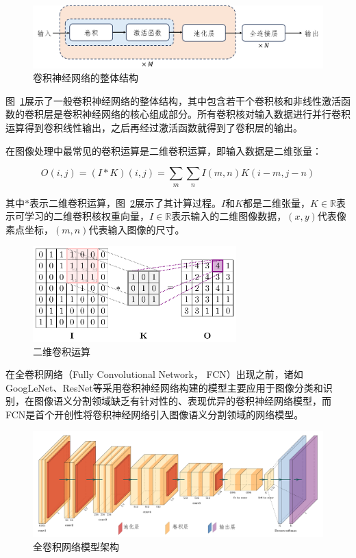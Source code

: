 \begin{figure}[htbp]
    \centering
    \includegraphics[width=\textwidth]{fig/cnn_frame.png}
    \caption{卷积神经网络的整体结构}
    \label{fig:cnn}
\end{figure}

图~\ref{fig:cnn}展示了一般卷积神经网络的整体结构，其中包含若干个卷积核和非线性激活函数的卷积层是卷积神经网络的核心组成部分。所有卷积核对输入数据进行并行卷积运算得到卷积线性输出，之后再经过激活函数就得到了卷积层的输出\cite{Goodfellow-et-al-2016}。

在图像处理中最常见的卷积运算是二维卷积运算，即输入数据是二维张量：

\begin{equation}
    O(i, j)=(I * K)(i, j)=\sum_{m} \sum_{n} I(m, n) K(i-m, j-n)
\end{equation}

其中$*$表示二维卷积运算，图~\ref{fig:2dcnn}展示了其计算过程。$I$和$K$都是二维张量，$ K \in \mathbb{R}$表示可学习的二维卷积核权重向量，$I \in \mathbb{R}$表示输入的二维图像数据，$(x, y)$代表像素点坐标，$(m, n)$代表输入图像的尺寸。

\begin{figure}[!htbp]
    \centering
    \includegraphics[width=0.7\textwidth]{fig/2dcnn-1.png}
    \caption{二维卷积运算}
    \label{fig:2dcnn}
\end{figure}

在全卷积网络（Fully Convolutional Network， FCN）出现之前，诸如GoogLeNet、ResNet等\cite{szegedy2014,he2015}采用卷积神经网络构建的模型主要应用于图像分类和识别，在图像语义分割领域缺乏有针对性的、表现优异的卷积神经网络模型，而FCN是首个开创性将卷积神经网络引入图像语义分割领域的网络模型\cite{shelhamer2016}。

\begin{figure}[!htbp]
    \centering
    \includegraphics[width=\textwidth]{fig/fcn_frame.png}
    \caption{全卷积网络模型架构}
    \label{fig:fcn_frame}
\end{figure}

